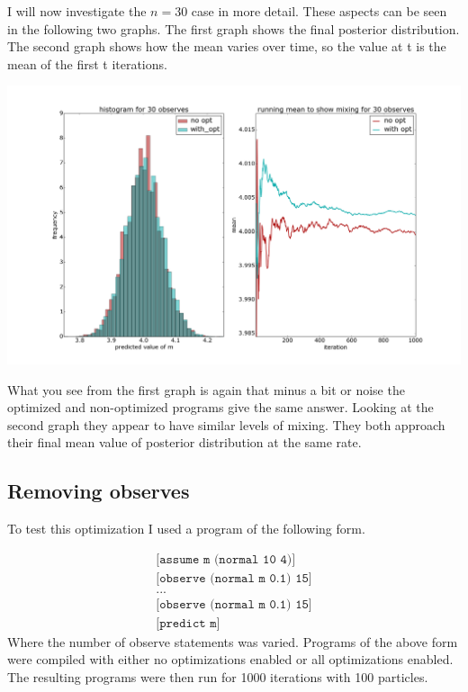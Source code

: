 \documentclass[a4paper]{article}
\begin{document}
I will now investigate the \(n = 30\) case in more detail. These aspects can be seen in the following two graphs. The first graph shows the final posterior distribution. The second graph shows how the mean varies over time, so the value at t is the mean of the first t iterations.

\centerline{\includegraphics[width=16cm]{images/merging_consecutive_observes_2.png}}

What you see from the first graph is again that minus a bit or noise the optimized and non-optimized programs give the same answer. Looking at the second graph they appear to have similar levels of mixing. They both approach their final mean value of posterior distribution at the same rate.




\subsection{Removing observes}

To test this optimization I used a program of the following form.

\[
	\begin{array}{l}
		\texttt{[assume m (normal 10 4)]} \\
		\texttt{[observe (normal m 0.1) 15]} \\
		\texttt{...} \\
		\texttt{[observe (normal m 0.1) 15]} \\
		\texttt{[predict m]}
	\end{array}
\]
Where the number of observe statements was varied. Programs of the above form were compiled with either no optimizations enabled or all optimizations enabled. The resulting programs were then run for 1000 iterations with 100 particles.
\end{document}

